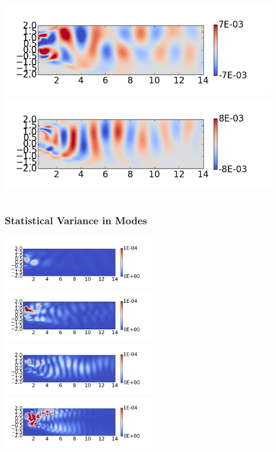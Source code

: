 \documentclass[9pt]{beamer}
\begin{document}
\begin{frame}
\begin{columns}[c]
    \includegraphics[width=0.9\textwidth]{PerturbRp95Re100POD2} \\
    \includegraphics[width=0.9\textwidth]{PerturbRp95Re100POD3}
\end{columns}
\end{frame}
\begin{frame}
\frametitle{Statistical Variance in Modes}
\label{sec-3-3}

\centering
\includegraphics[width=0.5\textwidth]{VariancePOD1} \\
\includegraphics[width=0.5\textwidth]{VariancePOD2} \\
\includegraphics[width=0.5\textwidth]{VariancePOD3} \\
\includegraphics[width=0.5\textwidth]{VariancePOD4} \\
\end{frame}
\end{document}
